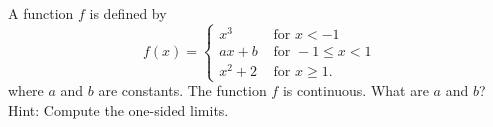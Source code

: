 A function $f$ is defined by 
\[
f(x)= \begin{cases}
  x^3 & \text{ for } x<-1\\
  ax+b & \text{ for } -1 \leq x <1\\
  x^2 +2 & \text{ for } x \geq 1.
\end{cases}
\]
where $a$ and $b$ are constants.  The function $f$ is continuous. What
are $a$ and $b$? Hint: Compute the one-sided limits.\answercheck
